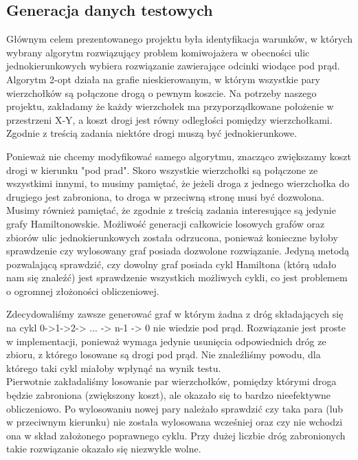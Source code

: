 \documentclass{article}
\begin{document}
\subsection{Generacja danych testowych}
\label{ss_generacja}

Głównym celem prezentowanego projektu była identyfikacja warunków, w których wybrany algorytm rozwiązujący problem komiwojażera w obecności ulic jednokierunkowych wybiera rozwiązanie zawierające odcinki wiodące pod prąd. \\

Algorytm 2-opt działa na grafie nieskierowanym, w którym wszystkie pary wierzchołków są połączone drogą o pewnym koszcie. Na potrzeby naszego projektu, zakładamy że każdy wierzchołek ma przyporządkowane położenie w przestrzeni X-Y, a koszt drogi jest równy odległości pomiędzy wierzchołkami. Zgodnie z treścią zadania niektóre drogi muszą być jednokierunkowe. 

Ponieważ nie chcemy modyfikować samego algorytmu, znacząco zwiększamy koszt drogi w kierunku "pod prad". Skoro wszystkie wierzchołki są połączone ze wszystkimi innymi, to musimy pamiętać, że jeżeli droga z jednego wierzchołka do drugiego jest zabroniona, to droga w przeciwną stronę musi być dozwolona. \\


Musimy również pamiętać, że zgodnie z treścią zadania interesujące są jedynie grafy Hamiltonowskie. Możliwość generacji całkowicie losowych grafów oraz zbiorów ulic jednokierunkowych została odrzucona, ponieważ konieczne byłoby sprawdzenie czy wylosowany graf posiada dozwolone rozwiązanie. Jedyną metodą pozwalającą sprawdzić, czy dowolny graf posiada cykl Hamiltona (którą udało nam się znaleźć) jest sprawdzenie wszystkich możliwych cykli, co jest problemem o ogromnej złożoności obliczeniowej.

Zdecydowaliśmy zawsze generować graf w którym żadna z dróg składających się na cykl 0->1->2-> ... -> n-1 -> 0 nie wiedzie pod prąd. Rozwiązanie jest proste w implementacji, ponieważ wymaga jedynie usunięcia odpowiednich dróg ze zbioru, z którego losowane są drogi pod prąd. Nie znaleźliśmy powodu, dla którego taki cykl miałoby wpłynąć na wynik testu. \\

Pierwotnie zakładaliśmy losowanie par wierzchołków, pomiędzy którymi droga będzie zabroniona (zwiększony koszt), ale okazało się to bardzo nieefektywne obliczeniowo. Po wylosowaniu nowej pary należało sprawdzić czy taka para (lub w przeciwnym kierunku) nie została wylosowana wcześniej oraz czy nie wchodzi ona w skład założonego poprawnego cyklu. Przy dużej liczbie dróg zabronionych takie rozwiązanie okazało się niezwykle wolne. \\
\end{document}

